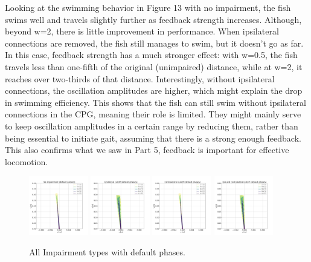 \documentclass{cmc}
\begin{document}
Looking at the swimming behavior in Figure 13 with no impairment, the fish swims well and travels slightly further as feedback strength increases. Although, beyond w=2, there is little improvement in performance. When ipsilateral connections are removed, the fish still manages to swim, but it doesn’t go as far. In this case, feedback strength has a much stronger effect: with w=0.5, the fish travels less than one-fifth of the original (unimpaired) distance, while at w=2, it reaches over two-thirds of that distance. Interestingly, without ipsilateral connections, the oscillation amplitudes are higher, which might explain the drop in swimming efficiency. This shows that the fish can still swim without ipsilateral connections in the CPG, meaning their role is limited. They might mainly serve to keep oscillation amplitudes in a certain range by reducing them, rather than being essential to initiate gait, assuming that there is a strong enough feedback. This also confirms what we saw in Part 5, feedback is important for effective locomotion.

\begin{figure}[htbp]
  \centering
  \includegraphics[width=0.23\textwidth]{our_figures/No impairment_default.png}
  \includegraphics[width=0.23\textwidth]{our_figures/Ipsilateral cutoff_default.png}
  \includegraphics[width=0.23\textwidth]{our_figures/Contralateral cutoff_default.png}
  \includegraphics[width=0.23\textwidth]{our_figures/Ipsi and Contralateral cutoff_default.png}
  \caption{All Impairment types with default phases.}
  \label{fig:default_phases}
\end{figure}
\end{document}
